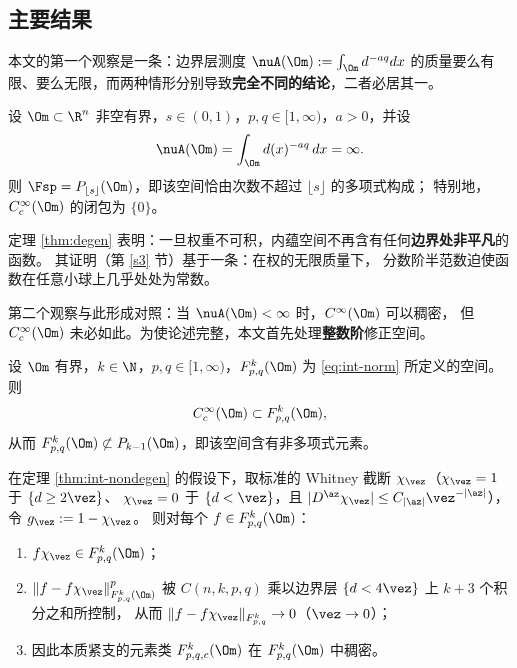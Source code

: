 \subsection{主要结果}\label{ss1.3}

本文的第一个观察是一条：边界层测度 $\nuA(\Om):=\int_\Om d^{-aq}dx$
的质量要么有限、要么无限，而两种情形分别导致\textbf{完全不同的结论}，二者必居其一。

\begin{theorem}[情形 (II)：不可积权下的刚性退化]\label{thm:degen}
设 $\Om\subset\R^n$ 非空有界，$s\in(0,1)$，$p,q\in[1,\infty)$，$a>0$，并设
\begin{equation}\label{eq:inf-mass}
  \nuA(\Om)=\int_\Om d(x)^{-aq}\,dx=\infty .
\end{equation}
则 $\Fsp=P_{\lfloor s\rfloor}(\Om)$，即该空间恰由次数不超过 $\lfloor s\rfloor$ 的多项式构成；
特别地，$C_c^\infty(\Om)$ 的闭包为 $\{0\}$。
\end{theorem}

定理 \ref{thm:degen} 表明：一旦权重不可积，内蕴空间不再含有任何\textbf{边界处非平凡}的函数。
其证明（第 \ref{s3} 节）基于一条：在权的无限质量下，
分数阶半范数迫使函数在任意小球上几乎处处为常数。

第二个观察与此形成对照：当 $\nuA(\Om)<\infty$ 时，$C^\infty(\Om)$ 可以稠密，
但 $C_c^\infty(\Om)$ 未必如此。为使论述完整，本文首先处理\textbf{整数阶}修正空间。

\begin{theorem}[整数阶修正空间的非退化性]\label{thm:int-nondegen}
设 $\Om$ 有界，$k\in\N$，$p,q\in[1,\infty)$，$F^k_{p,q}(\Om)$ 为 \eqref{eq:int-norm} 所定义的空间。则
\begin{equation}\label{eq:c-in-fk}
  C_c^\infty(\Om)\subset F^k_{p,q}(\Om),
\end{equation}
从而 $F^k_{p,q}(\Om)\not\subset P_{k-1}(\Om)$，即该空间含有非多项式元素。
\end{theorem}

\begin{theorem}\label{thm:truncation}
在定理 \ref{thm:int-nondegen} 的假设下，取标准的 Whitney 截断 $\chi_\vez$（$\chi_\vez=1$ 于 $\{d\ge2\vez\}$、
$\chi_\vez=0$ 于 $\{d<\vez\}$，且 $|D^\az\chi_\vez|\le C_{|\az|}\vez^{-|\az|}$），令 $g_\vez:=1-\chi_\vez$。
则对每个 $f\in F^k_{p,q}(\Om)$：
\begin{enumerate}[label=(\roman*)]
  \item $f\chi_\vez\in F^k_{p,q}(\Om)$；
  \item $\|f-f\chi_\vez\|^p_{F^k_{p,q}(\Om)}$ 被 $C(n,k,p,q)$ 乘以边界层 $\{d<4\vez\}$ 上 $k+3$ 个积分之和所控制，
        从而 $\|f-f\chi_\vez\|_{F^k_{p,q}}\to0$（$\vez\to0$）；
  \item 因此本质紧支的元素类 $F^k_{p,q,c}(\Om)$ 在 $F^k_{p,q}(\Om)$ 中稠密。
\end{enumerate}
\end{theorem}

